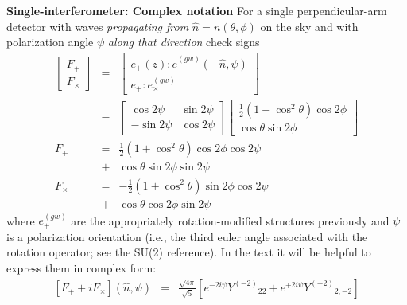 \documentclass[twocolumn,prd,nofootinbib]{revtex4}
\newcommand\editremark[1]{{\color{red} #1}}
\newcommand\Y[1]{Y^{(#1)}{}}
\begin{document}
\noindent \textbf{Single-interferometer: Complex notation}
For a single perpendicular-arm detector with waves \emph{propagating from} $\hat{n}=n(\theta,\phi)$ on the sky and with
polarization angle $\psi$ \emph{along that direction} \editremark{check signs}
\begin{subequations}
\label{eq:SingleIFOResponse}
\begin{eqnarray}
\begin{bmatrix}
F_+ \\ F_\times 
\end{bmatrix}
&=& \begin{bmatrix}
e_+(z):e_+^{(gw)}(-\hat{n},\psi) \\
e_+:e_\times^{(gw)} 
\end{bmatrix}
 \\
&=& 
\begin{bmatrix}
\cos 2\psi & \sin 2 \psi \\
- \sin 2 \psi & \cos 2 \psi
\end{bmatrix}
\begin{bmatrix}
\frac{1}{2} (1+\cos^2\theta) \cos2\phi  \\
\cos \theta \sin 2 \phi
\end{bmatrix} \nonumber
\\
F_\mathrm{+} &=&
 \frac{1}{2}(1+\cos^{2} \theta) \cos 2 \phi \cos 2 \psi
\nonumber\\ &+& \cos \theta \sin 2 \phi \sin 2 \psi \, \\ 
F_\mathrm{\times} &=&- \frac{1}{2}(1+\cos^{2} \theta) \sin 2 \phi \cos 2 \psi
\nonumber \\ &+& \cos \theta \cos 2 \phi \sin 2 \psi
\end{eqnarray}
\end{subequations}
where $e_+^{(gw)}$ are the appropriately rotation-modified structures
previously and $\psi$ is a polarization orientation (i.e., the third
euler angle associated with the rotation operator; see the SU(2) reference).  
%
In the text it will be helpful to express them in complex form:
\begin{eqnarray}
{} [F_{+}+i F_{\times}](\hat{n},\psi) &=& \frac{\sqrt{4\pi}}{\sqrt{5}}\left[ e^{-2i\psi}\Y{-2}_{22} +
  e^{+2i\psi}\Y{-2}_{2,-2}  \right] 
\end{eqnarray}
\end{document}
